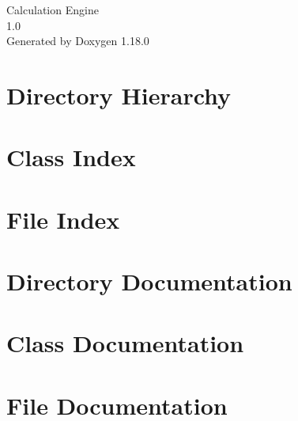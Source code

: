 \documentclass[twoside]{book}
\newcommand{\+}{\discretionary{\mbox{\scriptsize$\hookleftarrow$}}{}{}}
\newcommand{\clearemptydoublepage}{%
    \newpage{\pagestyle{empty}\cleardoublepage}%
  }
\begin{document}
  \raggedbottom
    \hypersetup{pageanchor=false,
                bookmarksnumbered=true,
                pdfencoding=unicode
               }
  \begin{titlepage}
  \vspace*{7cm}
  \begin{center}%
  {\Large Calculation Engine}\\
  [1ex]\large 1.\+0 \\
  \vspace*{1cm}
  {\large Generated by Doxygen 1.18.0}\\
  \end{center}
  \end{titlepage}
  \clearemptydoublepage
  \tableofcontents
  \clearemptydoublepage
  \hypersetup{pageanchor=true}


\chapter{Directory Hierarchy}

\chapter{Class Index}

\chapter{File Index}

\chapter{Directory Documentation}




\chapter{Class Documentation}


\chapter{File Documentation}






  \backmatter
  \newpage
  \clearemptydoublepage
  \printindex
\end{document}
